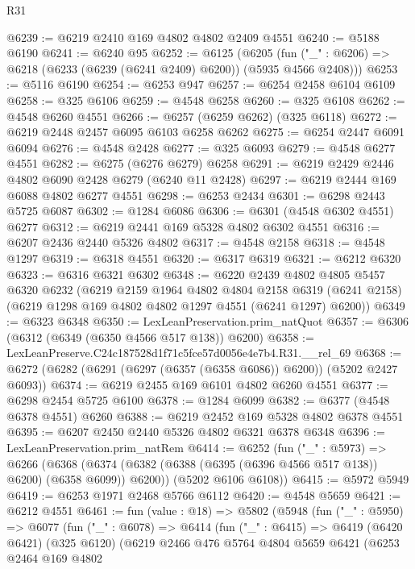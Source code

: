 \begin{lexlean}{R31}
\begin{coremodule}
@6239 := @6219 @2410 @169 @4802 @4802 @2409 @4551
@6240 := @5188 @6190
@6241 := @6240 @95
@6252 := @6125
    (@6205 (fun ("_" : @6206) => @6218 (@6233 (@6239 (@6241 @2409) @6200)) (@5935 @4566 @2408)))
@6253 := @5116 @6190
@6254 := @6253 @947
@6257 := @6254 @2458 @6104 @6109
@6258 := @325 @6106
@6259 := @4548 @6258
@6260 := @325 @6108
@6262 := @4548 @6260 @4551
@6266 := @6257 (@6259 @6262) (@325 @6118)
@6272 := @6219 @2448 @2457 @6095 @6103 @6258 @6262
@6275 := @6254 @2447 @6091 @6094
@6276 := @4548 @2428
@6277 := @325 @6093
@6279 := @4548 @6277 @4551
@6282 := @6275 (@6276 @6279) @6258
@6291 := @6219 @2429 @2446 @4802 @6090 @2428 @6279 (@6240 @11 @2428)
@6297 := @6219 @2444 @169 @6088 @4802 @6277 @4551
@6298 := @6253 @2434
@6301 := @6298 @2443 @5725 @6087
@6302 := @1284 @6086
@6306 := @6301 (@4548 @6302 @4551) @6277
@6312 := @6219 @2441 @169 @5328 @4802 @6302 @4551
@6316 := @6207 @2436 @2440 @5326 @4802
@6317 := @4548 @2158
@6318 := @4548 @1297
@6319 := @6318 @4551
@6320 := @6317 @6319
@6321 := @6212 @6320
@6323 := @6316 @6321 @6302
@6348 := @6220
    @2439
    @4802
    @4805
    @5457
    @6320
    @6232
    (@6219
      @2159
      @1964
      @4802
      @4804
      @2158
      @6319
      (@6241 @2158)
      (@6219 @1298 @169 @4802 @4802 @1297 @4551 (@6241 @1297) @6200))
@6349 := @6323 @6348
@6350 := LexLeanPreservation.prim_natQuot
@6357 := @6306 (@6312 (@6349 (@6350 @4566 @517 @138)) @6200)
@6358 := LexLeanPreserve.C24c187528d1f71c5fce57d0056e4e7b4.R31.__rel_69
@6368 := @6272 (@6282 (@6291 (@6297 (@6357 (@6358 @6086)) @6200)) (@5202 @2427 @6093))
@6374 := @6219 @2455 @169 @6101 @4802 @6260 @4551
@6377 := @6298 @2454 @5725 @6100
@6378 := @1284 @6099
@6382 := @6377 (@4548 @6378 @4551) @6260
@6388 := @6219 @2452 @169 @5328 @4802 @6378 @4551
@6395 := @6207 @2450 @2440 @5326 @4802 @6321 @6378 @6348
@6396 := LexLeanPreservation.prim_natRem
@6414 := @6252
    (fun ("_" : @5973) =>
    @6266
      (@6368 (@6374 (@6382 (@6388 (@6395 (@6396 @4566 @517 @138)) @6200) (@6358 @6099)) @6200))
      (@5202 @6106 @6108))
@6415 := @5972 @5949
@6419 := @6253 @1971 @2468 @5766 @6112
@6420 := @4548 @5659
@6421 := @6212 @4551
@6461 := fun (value : @18) =>
  @5802
    (@5948
      (fun ("_" : @5950) =>
      @6077
        (fun ("_" : @6078) =>
        @6414
          (fun ("_" : @6415) =>
          @6419
            (@6420 @6421)
            (@325 @6120)
            (@6219
              @2466
              @476
              @5764
              @4804
              @5659
              @6421
              (@6253
                @2464
                @169
                @4802

\end{coremodule}
\end{lexlean}
